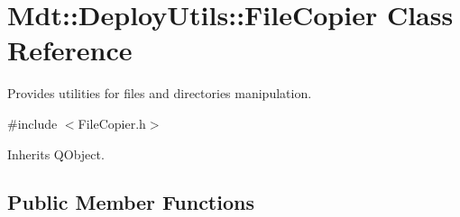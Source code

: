 \hypertarget{class_mdt_1_1_deploy_utils_1_1_file_copier}{}\section{Mdt\+:\+:Deploy\+Utils\+:\+:File\+Copier Class Reference}
\label{class_mdt_1_1_deploy_utils_1_1_file_copier}


Provides utilities for files and directories manipulation.  




{\ttfamily \#include $<$File\+Copier.\+h$>$}



Inherits Q\+Object.

\subsection*{Public Member Functions}
